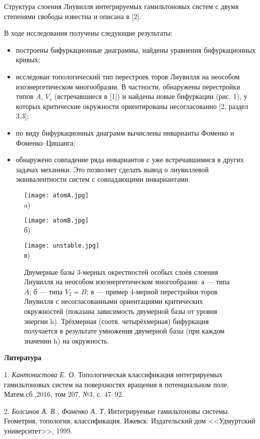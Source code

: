 Структура слоения Лиувилля интегрируемых гамильтоновых систем с двумя степенями свободы известна и описана в [2].

В ходе исследования получены следующие результаты:
\begin{itemize}
	\item построены бифуркационные диаграммы, найдены уравнения бифуркационных кривых;
	\item исследован топологический тип перестроек торов Лиувилля на неособом изоэнергетическом многообразии. В частности, обнаружены перестройки типов $A$, $V_s$ (встречавшиеся в [1]) и найдены новые бифуркации (рис. 1), у которых критические окружности ориентированы несогласованно [2, раздел 3.3];
	\item по виду бифуркационных диаграмм вычислены инварианты Фоменко и Фоменко--Цишанга;
	\item обнаружено совпадение ряда инвариантов с уже встречавшимися в других задачах механики. Это позволяет сделать вывод о лиувиллевой эквивалентности систем с совпадающими инвариантами.
\end{itemize}
\begin{figure}
\begin{minipage}{0.33\linewidth}
\begin{center}
\texttt{[image: atomA.jpg]} \\ a)
\end{center}
\end{minipage}
\hfill
\begin{minipage}{0.33\linewidth}
\begin{center}
\texttt{[image: atomB.jpg]} \\ б)
\end{center}
\end{minipage}
\hfill
\begin{minipage}{0.98\linewidth}
\begin{center}
\texttt{[image: unstable.jpg]} \\ в)
\end{center}
\end{minipage}
\caption{\small{Двумерные базы 3-мерных окрестностей особых слоёв слоения Лиувилля на неособом изоэнергетическом многообразии: а --- типа $A$; б --- типа $V_2=B$; в --- пример 4-мерной перестройки торов Лиувилля с несогласованными ориентациями критических окружностей (показана зависимость двумерной базы от уровня энергии h). Трёхмерная (соотв. четырёхмерная) бифуркация получается в результате умножения двумерной базы (при каждом значении h) на окружность.}}
\end{figure}

\smallskip \centerline {\bf Литература} \nopagebreak

1. {\it Кантонистова Е. О.} Топологическая классификация интегрируемых гамильтоновых систем на поверхностях вращения в потенциальном поле.
Матем.сб.,2016, том 207, №3, с. 47--92.

2. {\it Болсинов А. В., Фоменко А. Т.} Интегрируемые гамильтоновы системы. Геометрия, топология, классификация. Ижевск: Издательский дом <<Удмуртский университет>>, 1999.
